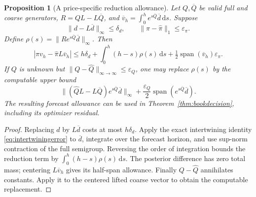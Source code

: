 \documentclass[11pt]{article}
\theoremstyle{plain}
\newtheorem{proposition}[theorem]{Proposition}
\theoremstyle{definition}
\theoremstyle{remark}
\newcommand{\dd}{\,\mathrm d}
\DeclareMathOperator{\spn}{span}
\begin{document}
\begin{proposition}[A price-specific reduction allowance]
\label{prop:priceresidual}
Let \(Q,\overline Q\) be valid full and coarse generators,
\(R=QL-L\overline Q\), and
\(\overline v_h=\int_0^h e^{s\overline Q}\overline d\dd s\).
Suppose
\[
 \|d-L\overline d\|_\infty\le\delta_d,\qquad
 \|\pi-\widehat\pi\|_1\le\varepsilon_\pi.
\]
Define \(\rho(s)=\|R e^{s\overline Q}\overline d\|_\infty\).
Then
\begin{equation}\label{eq:pricereductionbound}
 |\pi v_h-\widehat\pi L\overline v_h|
 \le h\delta_d+
       \int_0^h(h-s)\rho(s)\dd s+
       \tfrac12\spn(\overline v_h)\varepsilon_\pi .
\end{equation}
If \(Q\) is unknown but
\(\|Q-\widehat Q\|_{\infty\to\infty}\le\varepsilon_Q\), one may
replace \(\rho(s)\) by the computable upper bound
\[
 \|(\widehat QL-L\overline Q)e^{s\overline Q}\overline d\|_\infty
 +\frac{\varepsilon_Q}{2}
                   \spn(e^{s\overline Q}\overline d).
\]
The resulting forecast allowance can be used in
Theorem~\ref{thm:bookdecision}, including its optimizer residual.
\end{proposition}
\begin{proof}
Replacing \(d\) by \(L\overline d\) costs at most \(h\delta_d\).
Apply the exact intertwining identity
\eqref{eq:intertwiningerror} to \(\overline d\), integrate over
the forecast horizon, and use sup-norm contraction of the full
semigroup. Reversing the order of integration bounds the
reduction term by \(\int_0^h(h-s)\rho(s)\dd s\).
The posterior difference has zero total mass; centering
\(L\overline v_h\) gives its half-span allowance.
Finally \(Q-\widehat Q\) annihilates constants. Apply it to the
centered lifted coarse vector to obtain the computable replacement.
\end{proof}
\end{document}
